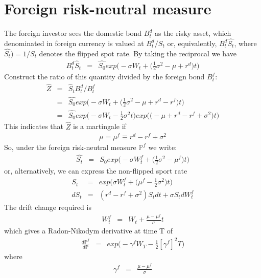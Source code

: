 \section{Foreign risk-neutral measure}
The foreign investor sees the domestic bond $B_{t}^{d}$ as the risky asset, which denominated in foreign currency is valued at $B_{t}^{d} / S_{t}$ or, equivalently, $B_{t}^{d}\hat{S_{t}}$,
where $\hat{S_{t}} )= 1/ S_{t}$ denotes the flipped spot rate. By taking the reciprocal we have
\begin{eqnarray}
	B_{t}^{d}\hat{S}_{t} &=& \hat{S_{0}}exp\bigg(-\sigma W_{t} + \bigg(\frac{1}{2}\sigma^{2} - \mu + r^{d}\bigg)t\bigg)
\end{eqnarray}
Construct the ratio of this quantity divided by the foreign bond $B_{t}^{f}$:
\begin{eqnarray}
	\nonumber
	\hat{Z} &=& \hat{S}_{t}B_{t}^{d} / B_{t}^{f}\\
	\nonumber
	&=& \hat{S_{0}}exp\bigg(-\sigma W_{t} + \bigg(\frac{1}{2}\sigma^{2} - \mu + r^{d} - r^{f}\bigg)t\bigg)\\
	&=& \hat{S_{0}}exp\bigg(-\sigma W_{t} - \frac{1}{2}\sigma^{2}t\bigg)exp\bigg(\bigg(-\mu + r^{d} - r^{f} + \sigma^{2}\bigg)t\bigg)
\end{eqnarray}
This indicates that $\hat{Z}$ is a martingale if
\begin{eqnarray}
	\mu = \mu^{f} \equiv r^{d} - r^{f} + \sigma^{2}
\end{eqnarray}
So, under the foreign risk-neutral measure $\mathbb{P}^{f}$ we write:
\begin{eqnarray}
	\hat{S_{t}} &=& S_{0}exp\bigg(-\sigma W_{t}^{f} + \bigg(\frac{1}{2}\sigma^{2} - \mu^{f}\bigg)t\bigg)
\end{eqnarray}
or, alternatively, we can express the non-flipped sport rate
\begin{eqnarray}
	S_{t} &=& exp\bigg(\sigma W_{t}^{f} + \bigg(\mu^{f} - \frac{1}{2}\sigma^{2}\bigg)t\bigg)\\
	dS_{t} &=& (r^{d} - r^{f} + \sigma^{2})S_{t}dt + \sigma S_{t}dW_{t}^{f}
\end{eqnarray}
The drift change required is
\begin{eqnarray}
	W_{t}^{f} &=& W_{t} + \frac{\mu -\mu^{f}}{\sigma}t
\end{eqnarray}
which gives a Radon-Nikodym derivative at time T of
\begin{eqnarray}
\frac{d\mathbb{P}^{f}}{d\mathbb{P}} &=& exp\bigg(-\gamma^{f}W_{T} - \frac{1}{2}[\gamma^{f}]^{2}T\bigg)
\end{eqnarray}
where
\begin{eqnarray}
\gamma^{f} &=& \frac{\mu - \mu^{f}}{\sigma}
\end{eqnarray}